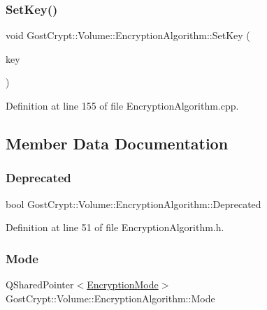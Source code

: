 \subsubsection{\texorpdfstring{Set\+Key()}{SetKey()}}
{\footnotesize\ttfamily void Gost\+Crypt\+::\+Volume\+::\+Encryption\+Algorithm\+::\+Set\+Key (\begin{DoxyParamCaption}\item[{const \hyperlink{class_gost_crypt_1_1_buffer_ptr}{Buffer\+Ptr} \&}]{key }\end{DoxyParamCaption})\hspace{0.3cm}{\ttfamily [virtual]}}



Definition at line 155 of file Encryption\+Algorithm.\+cpp.



\subsection{Member Data Documentation}
\mbox{\label{class_gost_crypt_1_1_volume_1_1_encryption_algorithm_aa6a4d985e35af681d88f813f082a0657}} 
\subsubsection{\texorpdfstring{Deprecated}{Deprecated}}
{\footnotesize\ttfamily bool Gost\+Crypt\+::\+Volume\+::\+Encryption\+Algorithm\+::\+Deprecated\hspace{0.3cm}{\ttfamily [protected]}}



Definition at line 51 of file Encryption\+Algorithm.\+h.

\mbox{\label{class_gost_crypt_1_1_volume_1_1_encryption_algorithm_a033ffbc7a4ff80377102654cff207b66}} 
\subsubsection{\texorpdfstring{Mode}{Mode}}
{\footnotesize\ttfamily Q\+Shared\+Pointer$<$\hyperlink{class_gost_crypt_1_1_volume_1_1_encryption_mode}{Encryption\+Mode}$>$ Gost\+Crypt\+::\+Volume\+::\+Encryption\+Algorithm\+::\+Mode\hspace{0.3cm}{\ttfamily [protected]}}



